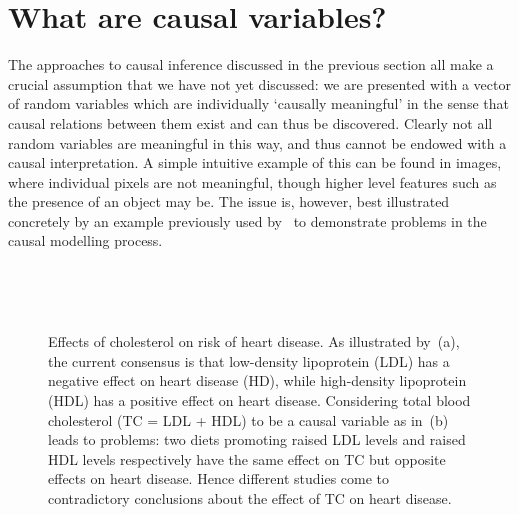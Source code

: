
\section{What are causal variables?}\label{sec:causality-what-are-causal-vars}

The approaches to causal inference discussed in the previous section all make a crucial assumption that we have not yet discussed: we are presented with a vector of random variables which are individually `causally meaningful' in the sense that causal relations between them exist and can thus be discovered. 
Clearly not all random variables are meaningful in this way, and thus cannot be endowed with a causal interpretation.
A simple intuitive example of this can be found in images, where individual pixels are not meaningful, though higher level features such as the presence of an object may be.
The issue is, however, best illustrated concretely by an example previously used by~\cite{spirtes2004causal} to demonstrate problems in the causal modelling process.


\begin{figure}
	\begin{subfigure}{.45\linewidth}
		\center\
		\caption{}\label{fig:cholesterol:a}
	\end{subfigure}
	\hfill
	\begin{subfigure}{.45\linewidth}
		\center\
		\caption{}\label{fig:cholesterol:b}
	\end{subfigure}
	\caption{Effects of cholesterol on risk of heart disease. As illustrated by~(a), the current consensus is that low-density lipoprotein (LDL) has a negative effect on heart disease (HD), while high-density lipoprotein (HDL) has a positive effect on heart disease. Considering total blood cholesterol (TC = LDL + HDL) to be a causal variable as in~(b) leads to problems: two diets promoting raised LDL levels and raised HDL levels respectively have the same effect on TC but opposite effects on heart disease. Hence different studies come to contradictory conclusions about the effect of TC on heart disease.}
	\label{fig:cholesterol}
\end{figure}



